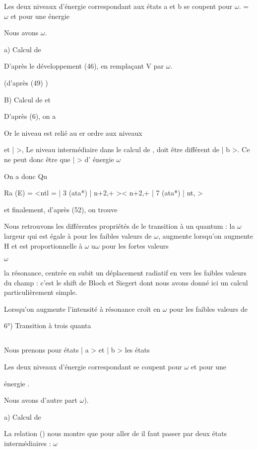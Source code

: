 Les deux niveaux d'énergie correspondant aux états a et b se coupent
pour $\omega$. = $\omega$ et pour une énergie 

Nous avons $\omega$.

a) Calcul de 

D'après le développement (46), en remplaçant V par
$\omega$.

(d'après (49) )


B) Calcul de  et 

D'après (6), on a

Or le niveau  est relié au er ordre aux niveaux

et |  >, Le niveau intermédiaire dans le calcul de ,  doit être différent de | b >.
Ce ne peut donc être que |  > d' énergie $\omega$

On a donc
Qu

Ra (E) = <ntl = | 3 (ata*) | n+2,+ >< n+2,+ | 7 (ata*) | nt, >

et finalement, d'après (52), on trouve

Nous retrouvons les différentes propriétés de le transition à un quantum : la
$\omega$
largeur qui est égale à  pour les faibles valeurs de $\omega$, augmente lorsqu'on
augmente H et est proportionnelle à $\omega$ u$\omega$ pour les fortes valeurs


$\omega$

la résonance, centrée en  subit un déplacement radiatif en
 vers les faibles valeurs du champ : c'est le shift de Bloch et Siegert
dont nous avons donné ici un calcul particulièrement simple.

Lorsqu'on augmente  l'intensité à résonance croît en $\omega$ pour
les faibles valeurs de 

6°) Transition à trois quanta
\subsection{}%

Nous prenons pour états | a > et | b > les états

Les deux niveaux d'énergie correspondant se coupent pour $\omega$ et pour une

énergie .

Nous avons d'autre part $\omega$).

a) Calcul de 

La relation () nous montre que pour aller de 
il faut passer par deux états intermédiaires :
$\omega$

